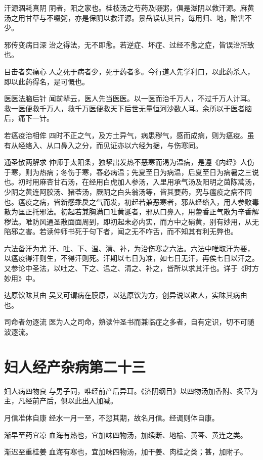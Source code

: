 \documentclass[a4paper,12pt,UTF8,twoside]{ctexbook}
\begin{document}
    汗源涸耗真阴
    阴者，阳之家也。桂枝汤之芍药及啜粥，俱是滋阴以救汗源。麻黄汤之用甘草与不啜粥，亦是保阴以救汗源。景岳误认其旨，每用归、地，贻害不少。
    
    邪传变病日深
    治之得法，无不即愈。若逆症、坏症、过经不愈之症，皆误治所致也。
    
    目击者实痛心
    人之死于病者少，死于药者多。今行道人先学利口，以此药杀人，即以此药得名，是可慨也。
    
    医医法脑后针
    闻前辈云，医人先当医医。以一医而治千万人，不过千万人计耳。救一医便救千万人，救千万医便救天下后世无量恒河沙数人耳。余所以于医者脑后，痛下一针。
    
    若瘟疫治相侔
    四时不正之气，及方土异气，病患秽气，感而成病，则为瘟疫。虽有从经络入、从口鼻入之分，而见证亦以六经为据，与伤寒同。
    
    通圣散两解求
    仲师于太阳条，独挈出发热不恶寒而渴为温病，是遵《内经》人伤于寒，则为热病；冬伤于寒，春必病温；先夏至日为病温，后夏至日为病暑之三说也。初时用麻杏甘石汤，在经用白虎加人参汤，入里用承气汤及阳明之茵陈蒿汤，少阴之黄连阿胶汤、猪苓汤，厥阴之白头翁汤等，皆其要药，究与瘟疫之病不同也。瘟疫之病，皆新感乖戾之气而发，初起若兼恶寒者，邪从经络入，用人参败毒散为匡正托邪法。初起若兼胸满口吐黄涎者，邪从口鼻入，用藿香正气散为辛香解秽法。唯防风通圣散面面周到，即初起未必内实，而方中之硝黄，别有妙用，从无陷邪之害。若读仲师书死于句下者，闻之无不咋舌，而不知其有利无弊也。
    
    六法备汗为尤
    汗、吐、下、温、清、补，为治伤寒之六法。六法中唯取汗为要，以瘟疫得汗则生，不得汗则死。汗期以七日为准，如七日无汗，再俟七日以汗之。又参论中圣法，以吐之、下之、温之、清之、补之，皆所以求其汗也。详于《时方妙用》中。
    
    达原饮昧其由
    吴又可谓病在膜原，以达原饮为方，创异说以欺人，实昧其病由也。
    
    司命者勿逐流
    医为人之司命，熟读仲圣书而兼临症之多者，自有定识，切不可随波逐流。
    \section{妇人经产杂病第二十三}
    妇人病四物良
    与男子同，唯经前产后异耳。《济阴纲目》以四物汤加香附、炙草为主，凡经前产后，俱以此出入加减。
    
    月信准体自康
    经水一月一至，不愆其期，故名月信。经调则体自康。
    
    渐早至药宜凉
    血海有热也，宜加味四物汤，加续断、地榆、黄芩、黄连之类。
    
    渐迟至重桂姜
    血海有寒也，宜加味四物汤，加干姜、肉桂之类；甚，加附子。
    
\end{document}

